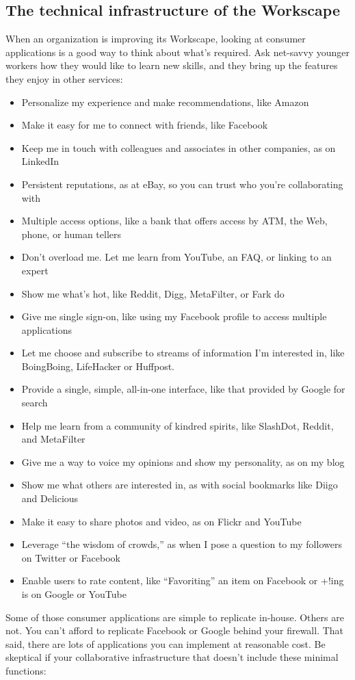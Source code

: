 \subsection{The technical infrastructure of the Workscape}

When an organization is improving its Workscape, looking at consumer
applications is a good way to think about what's required. Ask net-savvy
younger workers how they would like to learn new skills, and they bring
up the features they enjoy in other services:

\begin{itemize}
\item
  Personalize my experience and make recommendations, like Amazon
\item
  Make it easy for me to connect with friends, like Facebook
\item
  Keep me in touch with colleagues and associates in other companies, as
  on LinkedIn
\item
  Persistent reputations, as at eBay, so you can trust who you're
  collaborating with
\item
  Multiple access options, like a bank that offers access by ATM, the
  Web, phone, or human tellers
\item
  Don't overload me. Let me learn from YouTube, an FAQ, or linking to an
  expert
\item
  Show me what's hot, like Reddit, Digg, MetaFilter, or Fark do
\item
  Give me single sign-on, like using my Facebook profile to access
  multiple applications
\item
  Let me choose and subscribe to streams of information I'm interested
  in, like BoingBoing, LifeHacker or Huffpost.
\item
  Provide a single, simple, all-in-one interface, like that provided by
  Google for search
\item
  Help me learn from a community of kindred spirits, like SlashDot,
  Reddit, and MetaFilter
\item
  Give me a way to voice my opinions and show my personality, as on my
  blog
\item
  Show me what others are interested in, as with social bookmarks like
  Diigo and Delicious
\item
  Make it easy to share photos and video, as on Flickr and YouTube
\item
  Leverage ``the wisdom of crowds,'' as when I pose a question to my
  followers on Twitter or Facebook
\item
  Enable users to rate content, like ``Favoriting'' an item on Facebook
  or +!ing is on Google or YouTube
\end{itemize}
Some of those consumer applications are simple to replicate in-house.
Others are not. You can't afford to replicate Facebook or Google behind
your firewall. That said, there are lots of applications you can
implement at reasonable cost. Be skeptical if your collaborative
infrastructure that doesn't include these minimal functions:

